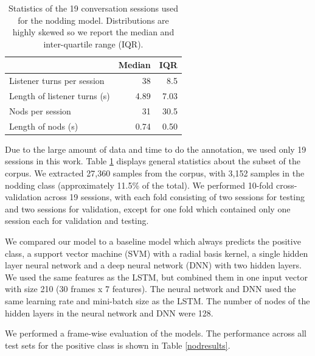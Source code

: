 \documentclass[letterpaper]{article} %
\begin{document}
\begin{table}[h]
\begin{center}
\begin{tabular}{|l|r|r|}
\hline & \bf Median & \bf IQR \\ \hline
Listener turns per session & 38 & 8.5\\
Length of listener turns (s) & 4.89 & 7.03\\
Nods per session & 31 & 30.5\\
Length of nods (s) & 0.74 & 0.50\\
\hline
\end{tabular}
\end{center}
\caption{\label{corpus} Statistics of the 19 conversation sessions used for the nodding model. Distributions are highly skewed so we report the median and inter-quartile range (IQR).}
\end{table}

Due to the large amount of data and time to do the annotation, we used only 19 sessions in this work. Table \ref{corpus} displays general statistics about the subset of the corpus. We extracted 27,360 samples from the corpus, with 3,152 samples in the nodding class (approximately 11.5\% of the total). We performed 10-fold cross-validation across 19 sessions, with each fold consisting of two sessions for testing and two sessions for validation, except for one fold which contained only one session each for validation and testing.


We compared our model to a baseline model which always predicts the positive class, a support vector machine (SVM) with a radial basis kernel, a single hidden layer neural network and a deep neural network (DNN) with two hidden layers. We used the same features as the LSTM, but combined them in one input vector with size 210 (30 frames x 7 features). The neural network and DNN used the same learning rate and mini-batch size as the LSTM. The number of nodes of the hidden layers in the neural network and DNN were 128.

We performed a frame-wise evaluation of the models. The performance across all test sets for the positive class is shown in Table \ref{nodresults}.
\end{document}
